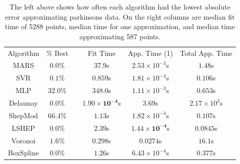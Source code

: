 \documentclass[smallextended,final]{svjour3}       %
\begin{document}
\begin{appendix}
\begin{table}
  \centering
  \begin{tabular}{|c|c| c |c|c|c|}
    \cline{1-2}\cline{4-6}
    Algorithm & \% Best &  & Fit Time & App. Time (1) & Total App. Time\\
    \cline{1-2}\cline{4-6}
    MARS & $0.0\%$ &  & $37.9$s & $2.53 \times 10^{-3}$s & $1.48$s\\
    SVR & $0.1\%$ &  & $0.859$s & $\mathit{1.81 \times 10^{-4}}$s & $\mathit{0.106}$s\\
    MLP & $\mathit{32.0}\%$ &  & $348.0$s & $1.11 \times 10^{-3}$s & $0.653$s\\
    Delaunay & $0.0\%$ &  & $\mathbf{1.90 \times 10^{-4}}$s & $3.69$s & $2.17 \times 10^{3}$s\\
    ShepMod & $\mathbf{66.4}\%$ &  & $1.13$s & $1.82 \times 10^{-4}$s & $0.107$s\\
    LSHEP & $0.0\%$ &  & $2.39$s & $\mathbf{1.44 \times 10^{-4}}$s & $\mathbf{0.0845}$s\\
    Voronoi & $1.6\%$ &  & $\mathit{0.298}$s & $0.0274$s & $16.1$s\\
    BoxSpline & $0.0\%$ &  & $1.26$s & $6.43 \times 10^{-4}$s & $0.377$s\\
    \cline{1-2}\cline{4-6}
  \end{tabular}
  \caption{The left above shows how often each algorithm had the lowest absolute error approximating parkinsons data. On the right columns are median fit time of 5288 points, median time for one approximation, and median time approximating 587 points.}
  \label{table:best-parkinsons}
\end{table}



\end{appendix}
\end{document}
